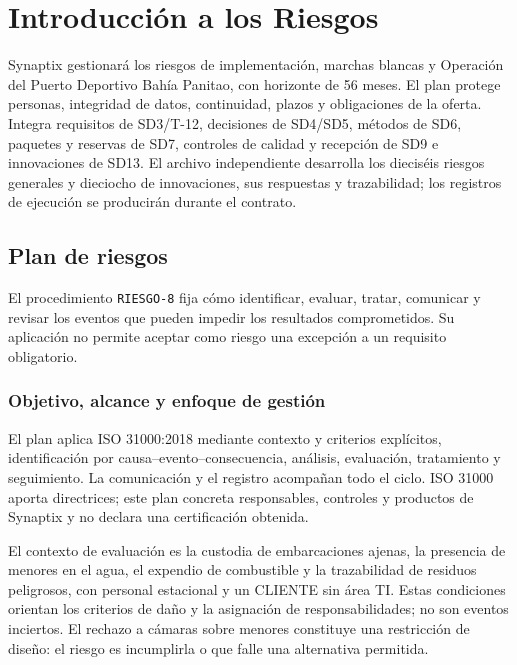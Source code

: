 \chapter{Introducción a los Riesgos}
Synaptix gestionará los riesgos de implementación, marchas blancas y Operación del Puerto Deportivo Bahía Panitao, con horizonte de 56 meses. El plan protege personas, integridad de datos, continuidad, plazos y obligaciones de la oferta. Integra requisitos de SD3/T-12, decisiones de SD4/SD5, métodos de SD6, paquetes y reservas de SD7, controles de calidad y recepción de SD9 e innovaciones de SD13. El archivo independiente \ArchivoTDieciseis{} desarrolla los dieciséis riesgos generales y dieciocho de innovaciones, sus respuestas y trazabilidad; los registros de ejecución se producirán durante el contrato. \parencites[Formulario T-7, apartado~10, p.~59; T-16, p.~63]{sd8-ba}[RT-19.04, p.~33]{sd8-bt}

\section{Plan de riesgos}
El procedimiento \texttt{RIESGO-8} fija cómo identificar, evaluar, tratar, comunicar y revisar los eventos que pueden impedir los resultados comprometidos. Su aplicación no permite aceptar como riesgo una excepción a un requisito obligatorio.

\subsection{Objetivo, alcance y enfoque de gestión}
El plan aplica ISO 31000:2018 mediante contexto y criterios explícitos, identificación por causa--evento--consecuencia, análisis, evaluación, tratamiento y seguimiento. La comunicación y el registro acompañan todo el ciclo. ISO 31000 aporta directrices; este plan concreta responsables, controles y productos de Synaptix y no declara una certificación obtenida. \parencite{sd8-iso31000}

El contexto de evaluación es la custodia de embarcaciones ajenas, la presencia de menores en el agua, el expendio de combustible y la trazabilidad de residuos peligrosos, con personal estacional y un CLIENTE sin área TI. Estas condiciones orientan los criterios de daño y la asignación de responsabilidades; no son eventos inciertos. El rechazo a cámaras sobre menores constituye una restricción de diseño: el riesgo es incumplirla o que falle una alternativa permitida. \parencite[caps.~1--3 y 19]{sd8-c07}

